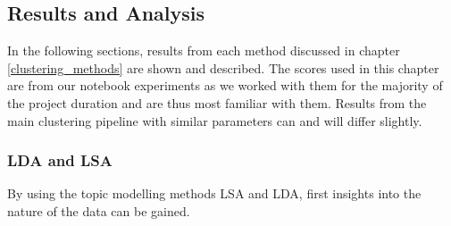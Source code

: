 \subsection{Results and Analysis}

In the following sections, results from each method discussed in chapter \ref{clustering_methods} are shown and described.
The scores used in this chapter are from our notebook experiments as we worked with them for the majority of the project duration and are thus most familiar with them. Results from the main clustering pipeline with similar parameters can and will differ slightly.

\subsubsection{LDA and LSA}
By using the topic modelling methods LSA and LDA, first insights into the nature of the data can be gained.

